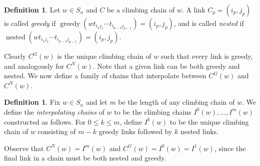 \documentclass[11pt]{amsart}
\theoremstyle{definition}
\newtheorem{definition}[theorem]{Definition}
\newenvironment{example}
{\pushQED{\qed}\renewcommand{\qedsymbol}{$\diamondsuit$}\examplex}
{\popQED\endexamplex}
\theoremstyle{named}
\newcommand{\CG}{C^G}
\newcommand{\CN}{C^N}
\DeclareMathOperator{\nested}{\mathrm{nested}}
\DeclareMathOperator{\greedy}{\mathrm{greedy}}
\begin{document}
	\begin{definition}
		Let $w\in S_n$ and $C$ be a climbing chain of $w$. 
		A link $C_p=(i_p,j_p)$ is called \emph{greedy} if $\greedy(wt_{i_1j_1}\cdots t_{i_{p-1}j_{p-1}}) = (i_p,j_p)$, and is called \emph{nested} if $\nested(wt_{i_1j_1}\cdots t_{i_{p-1}j_{p-1}}) = (i_p,j_p)$.
	\end{definition}
	Clearly $\CG(w)$ is the unique climbing chain of $w$ such that every link is greedy, and analogously for $\CN(w)$. Note that a given link can be both greedy and nested. We now define a family of chains that interpolate between $\CG(w)$ and $\CN(w)$.
	
	\begin{definition}
		\label{def:interpolatingchains}
		Fix $w\in S_n$ and let $m$ be the length of any climbing chain of $w$. We define the \emph{interpolating chains} of $w$ to be the climbing chains $I^0(w),\ldots,I^m(w)$ constructed as follows. 
		For $0\leq k\leq m$, define $I^k(w)$ to be the unique climbing chain of $w$ consisting of $m-k$ greedy links followed by $k$ nested links.
	\end{definition}
	
	Observe that $\CN(w) = I^m(w)$ and $\CG(w) = I^{0}(w) = I^{1}(w)$, since the final link in a chain must be both nested and greedy.
	
\end{document}
